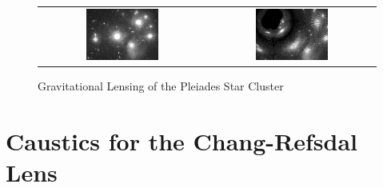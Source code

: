 \documentclass[a4paper]{IEEEtran}
\begin{document}
\begin{figure}
    \caption{Gravitational Lensing of the Pleiades Star Cluster} 
    \label{fig:pleiades} 
    \begin{center}
        \begin{tabular}{cc}
            \includegraphics[width=0.45\textwidth]{Pics/pl.eps} &
            \includegraphics[width=0.45\textwidth]{Pics/pl2e30.eps} 
        \end{tabular}
    \end{center}
\end{figure}

\section{Caustics for the Chang-Refsdal Lens}
\end{document}
